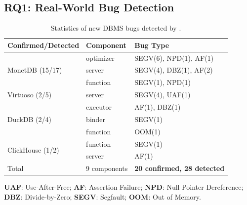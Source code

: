 \documentclass[conference]{IEEEtran}
\begin{document}
\subsection{RQ1: Real-World Bug Detection}
\begin{table}[b]
\centering
\small
\caption{Statistics of new DBMS bugs detected by \tool{}.}
\label{tab:real-world-bugs}
\setlength{\tabcolsep}{4pt}

\begin{tabularx}{\columnwidth}{l|l|X}
\toprule
\textbf{Confirmed/Detected} & \textbf{Component} & \textbf{Bug Type} \\
\midrule
\multirow{3}{*}{MonetDB (15/17)}
  & optimizer & SEGV(6), NPD(1), AF(1) \\
  & server    & SEGV(4), DBZ(1), AF(2) \\
  & function  & SEGV(1), NPD(1)        \\
\midrule
\multirow{1}{*}{Virtuoso (2/5)}
  & server    & SEGV(4), UAF(1)        \\
\midrule
\multirow{3}{*}{DuckDB (2/4)}
  & executor  & AF(1), DBZ(1)          \\
  & binder    & SEGV(1)                \\
  & function  & OOM(1)                 \\
\midrule
\multirow{2}{*}{ClickHouse (1/2)}
  & function  & SEGV(1)                \\
  & server    & AF(1)                  \\
\midrule
Total & 9 components & \textbf{20 confirmed, 28 detected} \\
\bottomrule
\end{tabularx}
\par\vspace{0.2em}
{\footnotesize \textbf{UAF}: Use-After-Free; \textbf{AF}: Assertion Failure; \textbf{NPD}: Null Pointer Dereference; \textbf{DBZ}: Divide-by-Zero; \textbf{SEGV}: Segfault; \textbf{OOM}: Out of Memory.}
\end{table}
\end{document}
